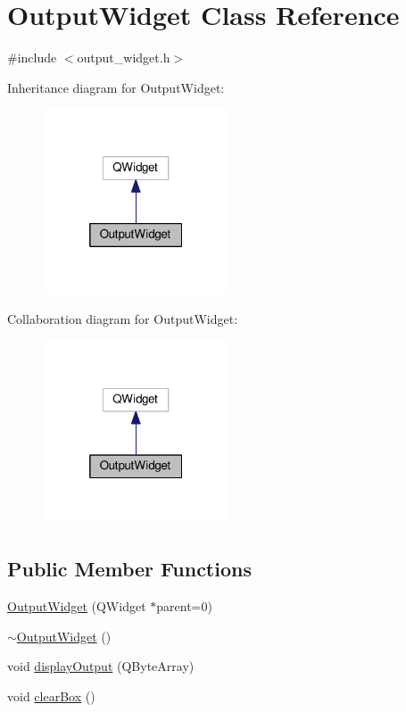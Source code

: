 \hypertarget{classOutputWidget}{}\section{Output\+Widget Class Reference}
\label{classOutputWidget}


{\ttfamily \#include $<$output\+\_\+widget.\+h$>$}



Inheritance diagram for Output\+Widget\+:\nopagebreak
\begin{figure}[H]
\begin{center}
\leavevmode
\includegraphics[width=157pt]{classOutputWidget__inherit__graph}
\end{center}
\end{figure}


Collaboration diagram for Output\+Widget\+:\nopagebreak
\begin{figure}[H]
\begin{center}
\leavevmode
\includegraphics[width=157pt]{classOutputWidget__coll__graph}
\end{center}
\end{figure}
\subsection*{Public Member Functions}
\begin{DoxyCompactItemize}
\item 
\hyperlink{classOutputWidget_a61df9bcea97f4c62b2d564d20bdbae91}{Output\+Widget} (Q\+Widget $\ast$parent=0)
\item 
\hyperlink{classOutputWidget_a7f00baf23905815aa3a846f0df8555bc}{$\sim$\+Output\+Widget} ()
\item 
void \hyperlink{classOutputWidget_a7dbe34186990f08c4ef33b026f4f65b3}{display\+Output} (Q\+Byte\+Array)
\item 
void \hyperlink{classOutputWidget_a75340d5f04a62332cfd52802090b52c4}{clear\+Box} ()
\end{DoxyCompactItemize}
